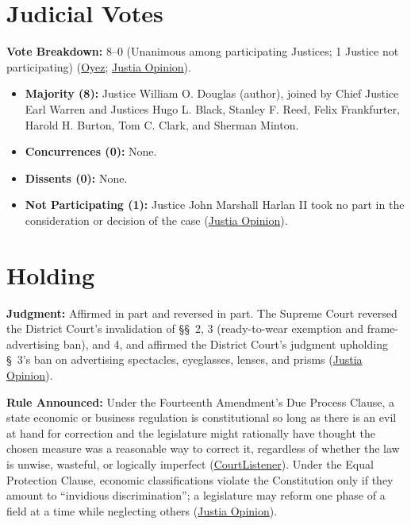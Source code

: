 \documentclass[12pt]{article}
\begin{document}
\section{Judicial Votes}
\textbf{Vote Breakdown:} 8--0 (Unanimous among participating Justices; 1 Justice not participating) (\href{https://www.oyez.org/cases/1940-1955/348us483}{Oyez}; \href{https://supreme.justia.com/cases/federal/us/348/483/}{Justia Opinion}).
\begin{itemize}
    \item \textbf{Majority (8):} Justice William O. Douglas (author), joined by Chief Justice Earl Warren and Justices Hugo L. Black, Stanley F. Reed, Felix Frankfurter, Harold H. Burton, Tom C. Clark, and Sherman Minton.
    \item \textbf{Concurrences (0):} None.
    \item \textbf{Dissents (0):} None.
    \item \textbf{Not Participating (1):} Justice John Marshall Harlan II took no part in the consideration or decision of the case (\href{https://supreme.justia.com/cases/federal/us/348/483/}{Justia Opinion}).
\end{itemize}

\section{Holding}
\textbf{Judgment:} Affirmed in part and reversed in part. The Supreme Court reversed the District Court's invalidation of \S\S~2, 3 (ready-to-wear exemption and frame-advertising ban), and 4, and affirmed the District Court's judgment upholding \S~3's ban on advertising spectacles, eyeglasses, lenses, and prisms (\href{https://supreme.justia.com/cases/federal/us/348/483/}{Justia Opinion}).

\textbf{Rule Announced:} Under the Fourteenth Amendment's Due Process Clause, a state economic or business regulation is constitutional so long as there is an evil at hand for correction and the legislature might rationally have thought the chosen measure was a reasonable way to correct it, regardless of whether the law is unwise, wasteful, or logically imperfect (\href{https://www.courtlistener.com/opinion/105285/williamson-v-lee-optical-of-oklahoma-inc/}{CourtListener}). Under the Equal Protection Clause, economic classifications violate the Constitution only if they amount to ``invidious discrimination''; a legislature may reform one phase of a field at a time while neglecting others (\href{https://supreme.justia.com/cases/federal/us/348/483/}{Justia Opinion}).
\end{document}
